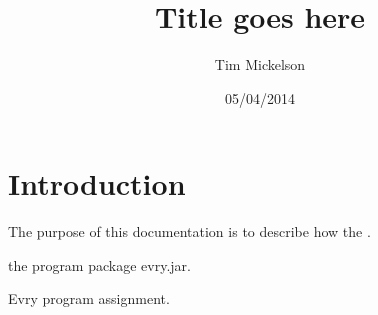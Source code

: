 \documentclass[a4paper]{article}
\title{Title goes here}
\author{Tim Mickelson}
\date{05/04/2014}
\begin{document}
\maketitle

\newpage

\section{Introduction}
The purpose of this documentation is to describe how the \cite{pdf}.

the program package evry.jar.

\begin{thebibliography}{99}
	Evry program assignment.
\end{thebibliography}
\end{document}

